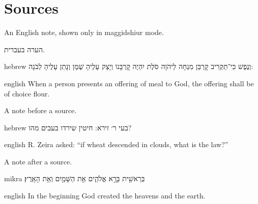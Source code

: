

\maketitle

\section{Sources}

\begin{hearah}
An English note, shown only in maggidshiur mode.
\end{hearah}

\begin{hearah}[hebrew]
הערה בעברית.
\end{hearah}

\begin{mekor}
\begin{mekorlang}{hebrew}
וְנֶפֶשׁ כִּי־תַקְרִיב קׇרְבַּן מִנְחָה לַיהֹוָה סֹלֶת יִהְיֶה קׇרְבָּנוֹ וְיָצַק עָלֶיהָ שֶׁמֶן וְנָתַן עָלֶיהָ לְבֹנָה:
\end{mekorlang}
\begin{mekorlang}{english}
When a person presents an offering of meal to God, the offering shall be of choice flour.
\end{mekorlang}
\end{mekor}

\begin{hearah}
A note before a source.
\end{hearah}

\begin{mekor}
\begin{mekorlang}{hebrew}
בעי ר׳ זירא: חיטין שירדו בעבים מהו?
\end{mekorlang}
\begin{mekorlang}{english}
R. Zeira asked: ``if wheat descended in clouds, what is the law?''
\end{mekorlang}
\end{mekor}

\begin{hearah}
A note after a source.
\end{hearah}

\begin{mekor}
\begin{mekorlang}{mikra}
בְּרֵאשִׁ֖ית בָּרָ֣א אֱלֹהִ֑ים אֵ֥ת הַשָּׁמַ֖יִם וְאֵ֥ת הָאָֽרֶץ׃
\end{mekorlang}
\begin{mekorlang}{english}
In the beginning God created the heavens and the earth.
\end{mekorlang}
\end{mekor}

